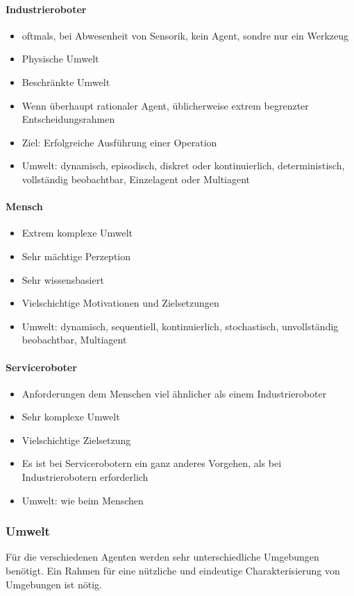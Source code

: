 \paragraph{Industrieroboter}
\begin{itemize}
	\item oftmals, bei Abwesenheit von Sensorik, kein Agent, sondre nur ein Werkzeug
	\item Physische Umwelt
	\item Beschränkte Umwelt
	\item Wenn überhaupt rationaler Agent, üblicherweise extrem begrenzter Entscheidungsrahmen
	\item Ziel: Erfolgreiche Ausführung einer Operation
	\item Umwelt: dynamisch, episodisch, diskret oder kontinuierlich, deterministisch, vollständig beobachtbar, Einzelagent oder Multiagent
\end{itemize}
\paragraph{Mensch}
\begin{itemize}
	\item Extrem komplexe Umwelt
	\item Sehr mächtige Perzeption
	\item Sehr wissensbasiert
	\item Vielschichtige Motivationen und Zielsetzungen
	\item Umwelt: dynamisch, sequentiell, kontinuierlich, stochastisch, unvollständig beobachtbar, Multiagent
\end{itemize}
\paragraph{Serviceroboter}
\begin{itemize}
	\item Anforderungen dem Menschen viel ähnlicher als einem Industrieroboter
	\item Sehr komplexe Umwelt
	\item Vielschichtige Zielsetzung
	\item Es ist bei Servicerobotern ein ganz anderes Vorgehen, als bei Industrierobotern erforderlich
	\item Umwelt: wie beim Menschen
\end{itemize}

\subsubsection{Umwelt}
Für die verschiedenen Agenten werden sehr unterschiedliche Umgebungen benötigt.
Ein Rahmen für eine nützliche und eindeutige Charakterisierung von Umgebungen ist nötig.
